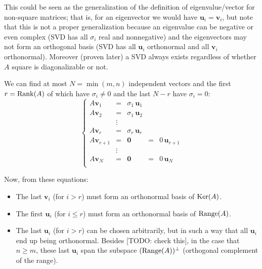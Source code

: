 \documentclass[
  12pt,
  paper=a4,
]{scrartcl} %
\begin{document}
This could be seen as the generalization of the definition of eigenvalue/vector for non-square matrices; that is, for an eigenvector we would have $\bm u_i= \bm v_i$, but note that this is not a proper generalization because an eigenvalue can be negative or even complex (SVD has all $\sigma_i$ real and nonnegative) and the eigenvectors may not form an orthogonal basis (SVD has all $\bm u_i$ orthonormal and all $\bm v_i$ orthonormal). Moreover (proven later) a SVD always exists regardless of whether $A$ square is diagonalizable or not.

We can find at most $N=\min(m,n)$ independent vectors and the first $r=\operatorname{Rank}(A)$ of which have $\sigma_i\neq 0$ and the last $N-r$ have $\sigma_i= 0$:
\[
\left\{
\begin{array}{lclcl}
 A \bm v_1 &=& \sigma_1 \, \bm u_1 \\
 A \bm v_2 &=& \sigma_1 \, \bm u_2 \\
 &\vdots \\
 A \bm v_r &=& \sigma_r \, \bm u_r \\
 A \bm v_{r+1} &=& \bm 0 &=& 0 \,\bm u_{r+1} \\
 &\vdots \\
 A \bm v_N &=& \bm 0 &=& 0 \,\bm u_{N} \\
\end{array}
\right.
\]
\newpage

Now, from these equations:
\begin{itemize}
    \item The last $\bm v_i$ (for $i>r$) must form an orthonormal basis of $\operatorname{Ker}(A)$.

    \item The first $\bm u_i$ (for $i\le r$) must form an orthonormal basis of $\operatorname{Range}(A)$.

    \item The last $\bm u_i$ (for $i>r$) can be chosen arbitrarily, but in such a way that all $\bm u_i$ end up being orthonormal. Besides [TODO: check this], in the case that $n\ge m$, these last $\bm u_i$ span the subspace $(\operatorname{Range}(A))^\perp$ (orthogonal complement of the range).

\end{itemize}
\end{document}
